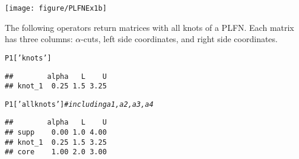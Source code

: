 \documentclass[11pt]{article}\usepackage[]{graphicx}\usepackage[]{color}
\makeatletter
\newcommand{\hlstr}[1]{\textcolor[rgb]{0.192,0.494,0.8}{#1}}%
\newcommand{\hlcom}[1]{\textcolor[rgb]{0.678,0.584,0.686}{\textit{#1}}}%
\newcommand{\hlstd}[1]{\textcolor[rgb]{0.345,0.345,0.345}{#1}}%
\newenvironment{kframe}{%
 \def\at@end@of@kframe{}%
 \ifinner\ifhmode%
  \def\at@end@of@kframe{\end{minipage}}%
  \begin{minipage}{\columnwidth}%
 \fi\fi%
 \def\FrameCommand##1{\hskip\@totalleftmargin \hskip-\fboxsep
 \colorbox{shadecolor}{##1}\hskip-\fboxsep
     \hskip-\linewidth \hskip-\@totalleftmargin \hskip\columnwidth}%
 \MakeFramed {\advance\hsize-\width
   \@totalleftmargin\z@ \linewidth\hsize
   \@setminipage}}%
 {\par\unskip\endMakeFramed%
 \at@end@of@kframe}
\newenvironment{knitrout}{}{} %
\makeatother
\begin{document}
\begin{center}
\begin{knitrout}\small
{}\color{fgcolor}

{\centering \texttt{[image: figure/PLFNEx1b]} 

}



\end{knitrout}
\end{center}

The following operators return matrices with all knots of a PLFN.
Each matrix has three columns: $\alpha$-cuts,
left side coordinates, and right side coordinates.

\begin{knitrout}\small
{}\color{fgcolor}\begin{kframe}
\begin{alltt}
\hlstd{P1[}\hlstr{'knots'}\hlstd{]}
\end{alltt}
\begin{verbatim}
##        alpha   L    U
## knot_1  0.25 1.5 3.25
\end{verbatim}
\begin{alltt}
\hlstd{P1[}\hlstr{'allknots'}\hlstd{]} \hlcom{# including a1,a2,a3,a4}
\end{alltt}
\begin{verbatim}
##        alpha   L    U
## supp    0.00 1.0 4.00
## knot_1  0.25 1.5 3.25
## core    1.00 2.0 3.00
\end{verbatim}
\end{kframe}
\end{knitrout}
\end{document}
